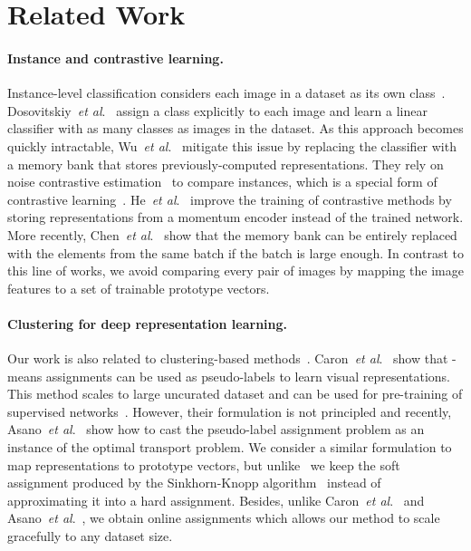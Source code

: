 \documentclass{article}
\def\onedot{.}
\def\etal{\emph{et al}\onedot}
\begin{document}
\section{Related Work}
\label{sec:related}

\paragraph{Instance and contrastive learning.}
Instance-level classification considers each image in a dataset as its own class~\cite{bojanowski2017unsupervised,dosovitskiy2016discriminative,wu2018unsupervised}.
Dosovitskiy~\etal~\cite{dosovitskiy2016discriminative} assign a class explicitly to each image and learn a linear classifier with as many classes as images in the dataset.
As this approach becomes quickly intractable, Wu~\etal~\cite{wu2018unsupervised} mitigate this issue by replacing the classifier with a memory bank that stores previously-computed representations.
They rely on noise contrastive estimation~\cite{gutmann2010noise} to compare instances, which is a special form of contrastive learning~\cite{hjelm2018learning,oord2018representation}.
He~\etal~\cite{he2019momentum} improve the training of contrastive methods by storing representations from a momentum encoder instead of the trained network.
More recently, Chen~\etal~\cite{chen2020simple} show that the memory bank can be entirely replaced with the elements from the same batch if the batch is large enough.
In contrast to this line of works, we avoid comparing every pair of images by mapping the image features to a set of trainable prototype vectors.

\paragraph{Clustering for deep representation learning.}
Our work is also related to clustering-based methods~\cite{asano2019self,bautista2016cliquecnn,caron2018deep,caron2019unsupervised,huang2019unsupervised,xie2016unsupervised,yang2016joint,zhuang2019local,gidaris2020learning,yan2020cluster}.
Caron~\etal~\cite{caron2018deep} show that -means assignments can be used as pseudo-labels to learn visual representations.
This method scales to large uncurated dataset and can be used for pre-training of supervised networks~\cite{caron2019unsupervised}.
However, their formulation is not principled and recently, Asano~\etal~\cite{asano2019self} show how to cast the pseudo-label assignment problem as an instance of the optimal transport problem.
We consider a similar formulation to map representations to prototype vectors, but unlike~\cite{asano2019self} we keep the soft assignment produced by the Sinkhorn-Knopp algorithm~\cite{cuturi2013sinkhorn} instead of approximating it into a hard assignment.
Besides, unlike Caron~\etal~\cite{caron2018deep,caron2019unsupervised} and Asano~\etal~\cite{asano2019self}, we obtain online assignments which allows our method to scale gracefully to any dataset size.
\end{document}
